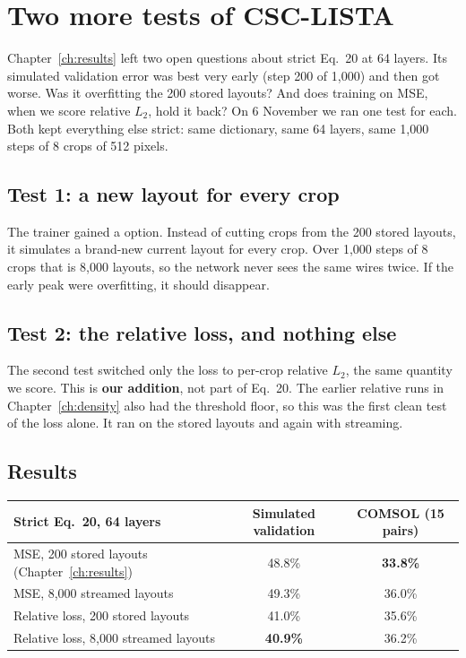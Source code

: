 \chapter{Two more tests of CSC-LISTA}\label{ch:followups}

Chapter~\ref{ch:results} left two open questions about strict Eq.~20 at 64 layers. Its simulated validation error was
best very early (step 200 of 1,000) and then got worse. Was it overfitting the 200 stored layouts? And does training on
MSE, when we score relative $L_2$, hold it back? On 6 November we ran one test for each. Both kept everything else
strict: same dictionary, same 64 layers, same 1,000 steps of 8 crops of 512 pixels.

\section{Test 1: a new layout for every crop}

The trainer gained a  option. Instead of cutting crops from the 200 stored layouts, it simulates a brand-new
current layout for every crop. Over 1,000 steps of 8 crops that is 8,000 layouts, so the network never sees the same wires
twice. If the early peak were overfitting, it should disappear.

\section{Test 2: the relative loss, and nothing else}

The second test switched only the loss to per-crop relative $L_2$, the same quantity we score. This is \textbf{our
addition}, not part of Eq.~20. The earlier relative runs in Chapter~\ref{ch:density} also had the threshold floor, so this
was the first clean test of the loss alone. It ran on the stored layouts and again with streaming.

\section{Results}

\begin{center}
\begin{tabular}{lcc}
\toprule
Strict Eq.~20, 64 layers & Simulated validation & COMSOL (15 pairs) \\
\midrule
MSE, 200 stored layouts (Chapter~\ref{ch:results}) & 48.8\% & \textbf{33.8\%} \\
MSE, 8,000 streamed layouts & 49.3\% & 36.0\% \\
Relative loss, 200 stored layouts & 41.0\% & 35.6\% \\
Relative loss, 8,000 streamed layouts & \textbf{40.9\%} & 36.2\% \\
\bottomrule
\end{tabular}
\end{center}

